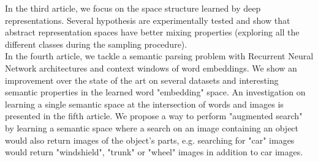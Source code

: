 In the third article, we focus on the space structure learned by deep
representations. Several hypothesis are experimentally tested and show that
abstract representation spaces have better mixing properties (exploring all the
different classes during the sampling procedure).\\

In the fourth article, we tackle a semantic parsing problem with Recurrent
Neural Network architectures and context windows of word embeddings. We show an
improvement over the state of the art on several datasets and interesting
semantic properties in the learned word "embedding" space.  An investigation on
learning a single semantic space at the intersection of words and images is
presented in the fifth article. We propose a way to perform "augmented search"
by learning a semantic space where a search on an image containing an object
would also return images of the object's parts, e.g. searching for "car" images
would return "windshield", "trunk" or "wheel" images in addition to car images.

